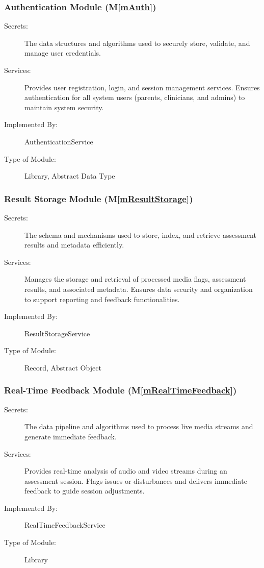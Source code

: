 \documentclass[12pt, titlepage]{article}
\newcommand{\mref}[1]{M\ref{#1}}
\begin{document}
\subsubsection{Authentication Module (\mref{mAuth})}

\begin{description}
\item[Secrets:] The data structures and algorithms used to securely store, validate, and manage user credentials.
\item[Services:] Provides user registration, login, and session management services. Ensures authentication for all system users (parents, clinicians, and admins) to maintain system security.
\item[Implemented By:] AuthenticationService
\item[Type of Module:] Library, Abstract Data Type
\end{description}

\subsubsection{Result Storage Module (\mref{mResultStorage})}

\begin{description}
\item[Secrets:] The schema and mechanisms used to store, index, and retrieve assessment results and metadata efficiently.
\item[Services:] Manages the storage and retrieval of processed media flags, assessment results, and associated metadata. Ensures data security and organization to support reporting and feedback functionalities.
\item[Implemented By:] ResultStorageService
\item[Type of Module:] Record, Abstract Object
\end{description}

\subsubsection{Real-Time Feedback Module (\mref{mRealTimeFeedback})}

\begin{description}
\item[Secrets:] The data pipeline and algorithms used to process live media streams and generate immediate feedback.
\item[Services:] Provides real-time analysis of audio and video streams during an assessment session. Flags issues or disturbances and delivers immediate feedback to guide session adjustments.
\item[Implemented By:] RealTimeFeedbackService
\item[Type of Module:] Library
\end{description}
\end{document}
